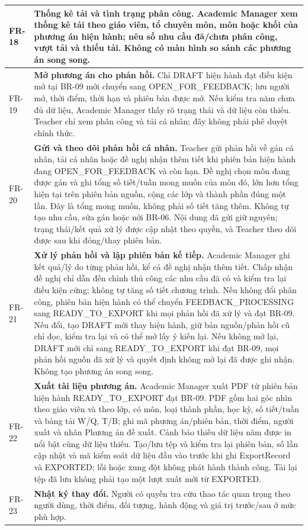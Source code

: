 \documentclass[12pt,a4paper]{report}
\begin{document}
\begin{longtable}{|p{1.45cm}|p{12.5cm}|}
FR-18 & \textbf{Thống kê tải và tình trạng phân công.} Academic Manager xem thống kê tải theo giáo viên, tổ chuyên môn, môn hoặc khối của phương án hiện hành; nêu số nhu cầu đã/chưa phân công, vượt tải và thiếu tải. Không có màn hình so sánh các phương án song song. \\\hline
FR-19 & \textbf{Mở phương án cho phản hồi.} Chỉ DRAFT hiện hành đạt điều kiện mở tại BR-09 mới chuyển sang OPEN\_FOR\_FEEDBACK; lưu người mở, thời điểm, thời hạn và phiên bản được mở. Nếu kiểm tra năm chưa đủ dữ liệu, Academic Manager thấy rõ trạng thái và dữ liệu còn thiếu. Teacher chỉ xem phân công và tải cá nhân; đây không phải phê duyệt chính thức. \\\hline
FR-20 & \textbf{Gửi và theo dõi phản hồi cá nhân.} Teacher gửi phản hồi về gán cá nhân, tải cá nhân hoặc đề nghị nhận thêm tiết khi phiên bản hiện hành đang OPEN\_FOR\_FEEDBACK và còn hạn. Đề nghị chọn môn đang được gán và ghi tổng số tiết/tuần mong muốn của môn đó, lớn hơn tổng hiện tại trên phiên bản nguồn, cộng các lớp và thành phần đúng một lần. Đây là tổng mong muốn, không phải số tiết tăng thêm. Không tự tạo nhu cầu, sửa gán hoặc nới BR-06. Nội dung đã gửi giữ nguyên; trạng thái/kết quả xử lý được cập nhật theo quyền, và Teacher theo dõi được sau khi đóng/thay phiên bản. \\\hline
FR-21 & \textbf{Xử lý phản hồi và lập phiên bản kế tiếp.} Academic Manager ghi kết quả/lý do từng phản hồi, kể cả đề nghị nhận thêm tiết. Chấp nhận đề nghị chỉ dẫn đến chỉnh thủ công các nhu cầu đã có và kiểm tra lại điều kiện cứng; không tự tăng số tiết chương trình. Nếu không đổi phân công, phiên bản hiện hành có thể chuyển FEEDBACK\_PROCESSING sang READY\_TO\_EXPORT khi mọi phản hồi đã xử lý và đạt BR-09. Nếu đổi, tạo DRAFT mới thay hiện hành, giữ bản nguồn/phản hồi cũ chỉ đọc, kiểm tra lại và có thể mở lấy ý kiến lại. Nếu không mở lại, DRAFT mới chỉ sang READY\_TO\_EXPORT khi đạt BR-09, mọi phản hồi nguồn đã xử lý và quyết định không mở lại đã được ghi nhận. Không tạo phương án song song. \\\hline
FR-22 & \textbf{Xuất tài liệu phương án.} Academic Manager xuất PDF từ phiên bản hiện hành READY\_TO\_EXPORT đạt BR-09. PDF gồm hai góc nhìn theo giáo viên và theo lớp, có môn, loại thành phần, học kỳ, số tiết/tuần và bảng tải W/Q, T/B; ghi mã phương án/phiên bản, thời điểm, người xuất và nhãn Phương án đề xuất. Cảnh báo thiếu dữ liệu năm được in nổi bật cùng dữ liệu thiếu. Tạo/lưu tệp và kiểm tra lại phiên bản, số lần cập nhật và mã kiểm soát dữ liệu đầu vào trước khi ghi ExportRecord và EXPORTED; lỗi hoặc xung đột không phát hành thành công. Tải lại tệp đã lưu không phải tạo một lượt xuất mới từ EXPORTED. \\\hline
FR-23 & \textbf{Nhật ký thay đổi.} Người có quyền tra cứu thao tác quan trọng theo người dùng, thời điểm, đối tượng, hành động và giá trị trước/sau ở mức phù hợp. \\\hline
\end{longtable}
\end{document}
